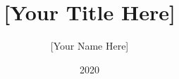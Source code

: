 \documentclass[]{dukedissertation}
\author{[Your Name Here]}
\title{[Your Title Here]}
\date{2020} %
\begin{document}
\maketitle



\dedication{If you want to dedicate your thesis to anyone do so here}

\tableofcontents %
\listoftables	%
\listoffigures	%



%
%
%




\end{document}
